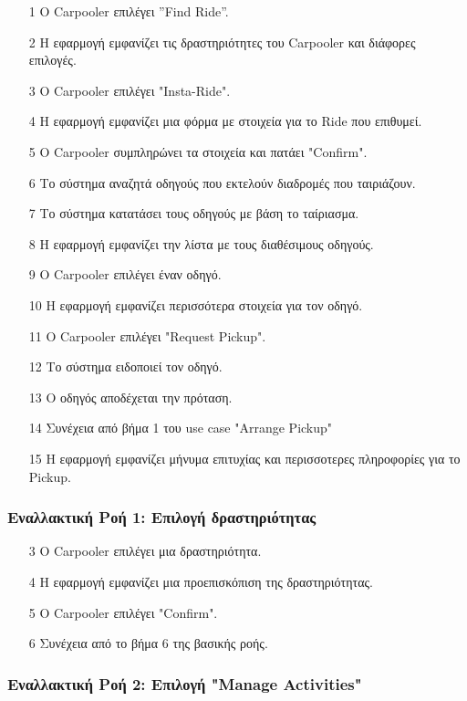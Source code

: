 \begin{enumerate}
    \item[1] Ο Carpooler επιλέγει ”Find Ride”.
    \item[2] Η εφαρμογή εμφανίζει τις δραστηριότητες του Carpooler και διάφορες επιλογές.
    \item[3] Ο Carpooler επιλέγει "Insta-Ride".
    \item[4] Η εφαρμογή εμφανίζει μια φόρμα με στοιχεία για το Ride που επιθυμεί.
    \item[5] Ο Carpooler συμπληρώνει τα στοιχεία και πατάει "Confirm".
    \item[6] Το σύστημα αναζητά οδηγούς που εκτελούν διαδρομές που ταιριάζουν.
    \item[7] Το σύστημα κατατάσει τους οδηγούς με βάση το ταίριασμα.
    \item[8] Η εφαρμογή εμφανίζει την λίστα με τους διαθέσιμους οδηγούς.
    \item[9] Ο Carpooler επιλέγει έναν οδηγό.
    \item[10] Η εφαρμογή εμφανίζει περισσότερα στοιχεία για τον οδηγό.
    \item[11] Ο Carpooler επιλέγει "Request Pickup".
    \item[12] Το σύστημα ειδοποιεί τον οδηγό.
    \item[13] Ο οδηγός αποδέχεται την πρόταση.
    \item[14] Συνέχεια από βήμα 1 του use case "Arrange Pickup"
    \item[15] Η εφαρμογή εμφανίζει μήνυμα επιτυχίας και περισσοτερες πληροφορίες για το Pickup. %
\end{enumerate}

\subsubsection{Εναλλακτική Ροή 1: Επιλογή δραστηριότητας}

\begin{enumerate}
    \item[3] O Carpooler επιλέγει μια δραστηριότητα.
    \item[4] Η εφαρμογή εμφανίζει μια προεπισκόπιση της δραστηριότητας.
    \item[5] O Carpooler επιλέγει "Confirm".
    \item[6] Συνέχεια από το βήμα 6 της βασικής ροής.
\end{enumerate}

\subsubsection{Εναλλακτική Ροή 2: Επιλογή "Manage Activities"}

